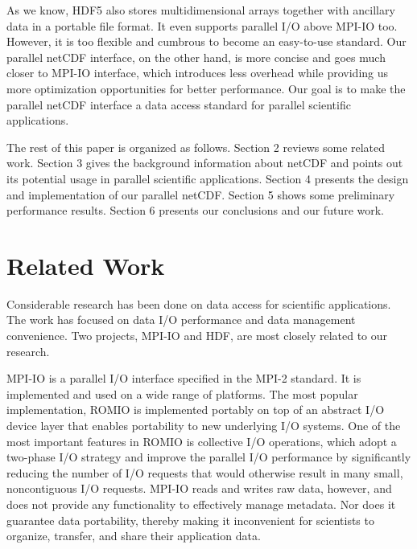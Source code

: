 \documentclass[10pt,twocolumn]{article}          %
\begin{document}
As we know, HDF5 \cite{HDF5} also stores multidimensional arrays together with ancillary data in a
portable file format. It even supports parallel I/O above MPI-IO too. However, it is too flexible
and cumbrous to become an easy-to-use standard. Our parallel netCDF interface, on the other hand,
is more concise and goes much closer to MPI-IO interface, which introduces less overhead while
providing us more optimization opportunities for better performance. Our goal is to make the
parallel netCDF interface a data access standard for parallel scientific applications.

The rest of this paper is organized as follows. Section 2 reviews some related work.
Section 3 gives the background information about netCDF and points out its potential usage in parallel
scientific applications. Section 4 presents the design and implementation of our parallel netCDF.
Section 5 shows some preliminary performance results. Section 6 presents our conclusions and
our future work.


\section{Related Work}

Considerable research has been done on data access for scientific applications. The work has focused 
on data I/O performance and data management convenience. Two projects, MPI-IO and HDF,
are most closely related to our research.

MPI-IO is a parallel I/O interface specified in the MPI-2 standard. It is implemented and used on a
wide range of platforms. The most popular implementation, ROMIO 
\cite{TRLG02} is implemented portably on top of an
abstract I/O device layer \cite{ThGL96,ThGL99b} that enables portability to new underlying
I/O systems. One of the most important features in ROMIO is collective I/O operations, which
adopt a two-phase I/O strategy \cite{RoBC93,TBCP94,ThCh96,ThGL99} and improve the parallel I/O
performance by significantly reducing the number of I/O requests that would otherwise result in
many small, noncontiguous I/O requests.  MPI-IO reads and writes raw
data, however, and does not provide any functionality to effectively manage metadata. Nor does it guarantee
data portability, thereby making it inconvenient for scientists to organize, transfer, and share their
application data.
\end{document}

